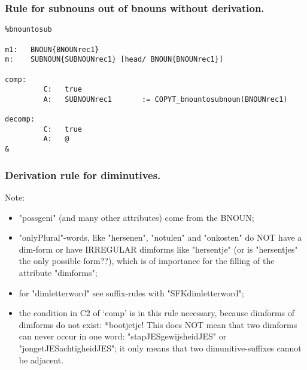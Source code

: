 \subsubsection{Rule for subnouns out of bnouns without derivation.}
\begin{verbatim}
%bnountosub

m1:   BNOUN{BNOUNrec1}
m:    SUBNOUN{SUBNOUNrec1} [head/ BNOUN{BNOUNrec1}]

comp:    
         C:   true
         A:   SUBNOUNrec1       := COPYT_bnountosubnoun(BNOUNrec1)

decomp:  
         C:   true
         A:   @
&
\end{verbatim}
\newpage
\subsubsection{Derivation rule for diminutives.}
Note: 
\begin{itemize}
  \item "possgeni" (and many other attributes) come from the BNOUN;
  \item "onlyPlural"-words, like "hersenen", "notulen" and "onkosten" do NOT
         have a dim-form or have IRREGULAR dimforms like "hersentje" (or is
         "hersentjes" the only possible form??), which is of importance for the
         filling of the attribute "dimforms";
  \item for "dimletterword" see suffix-rules with "SFKdimletterword";
  \item the condition in C2 of `comp' is in this rule necessary, because
         dimforms of dimforms do not exist: *bootjetje! 
         This does NOT mean that two dimforms can never occur in one word:
         "stapJESgewijsheidJES" or "jongetJESachtigheidJES"; it only means that 
         two dimunitive-suffixes cannot be adjacent.
\end{itemize}
